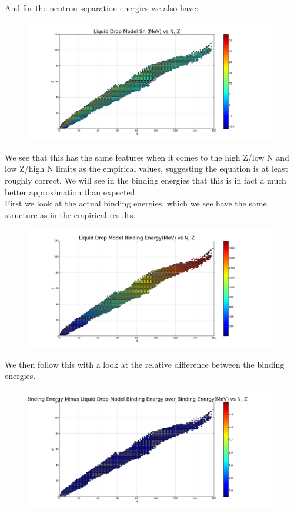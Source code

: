 \documentclass[11pt]{article} %
\begin{document}
And for the neutron separation energies we also have:\\
\vspace{1mm}
\begin{figure}[htbp]
\centering
\includegraphics[width=.7\linewidth]{"LiquidDropNeutronSepEnergy"}
\end{figure}
\vspace{1mm}

We see that this has the same features when it comes to the high Z/low N and low Z/high N limits as the empirical values, suggesting the equation is at least roughly correct. We will see in the binding energies that this is in fact a much better approximation than expected. \\

First we look at the actual binding energies, which we see have the same structure as in the empirical results.
\vspace{1mm}
\begin{figure}[htbp]
\centering
\includegraphics[width=.7\linewidth]{"LiquidDropBindingEnergy"}
\end{figure}
\vspace{1mm}

We then follow this with a look at the relative difference between the binding energies.\\

\vspace{1mm}
\begin{figure}[htbp]
\centering
\includegraphics[width=.7\linewidth]{"ComparisonLiquidDropExpBE"}
\end{figure}
\vspace{1mm}
 
\end{document}
